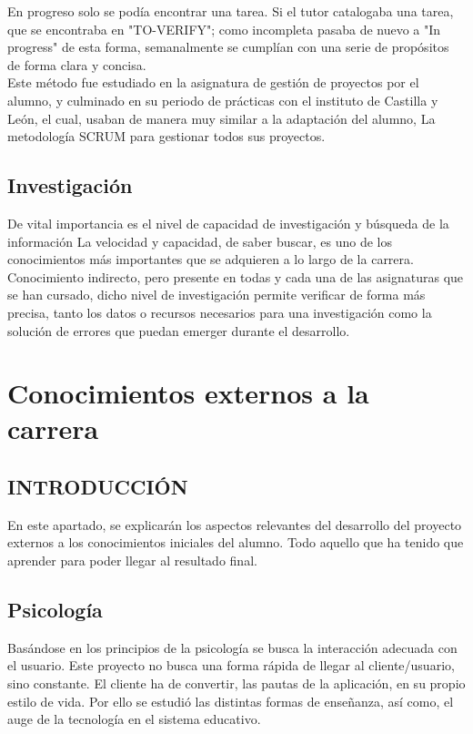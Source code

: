En progreso solo se podía encontrar una tarea. Si el tutor catalogaba una tarea, que se encontraba en "TO-VERIFY"; como incompleta pasaba de nuevo a "In progress" de esta forma, semanalmente se cumplían con una serie de propósitos de forma clara y concisa. \\
Este método fue estudiado en la asignatura de gestión de proyectos por el alumno, y culminado en su periodo de prácticas con el instituto de Castilla y León, el cual, usaban de manera muy similar a la adaptación del alumno, La metodología SCRUM para gestionar todos sus proyectos.\\

\subsection{Investigación}
De vital importancia es el nivel de capacidad de investigación y búsqueda de la información La velocidad y capacidad, de saber buscar, es uno de los conocimientos más importantes que se adquieren a lo largo de la carrera. Conocimiento indirecto, pero presente en todas y cada una de las asignaturas que se han cursado, dicho nivel de investigación permite verificar de forma más precisa, tanto los datos o recursos necesarios para una investigación como la solución de errores que puedan emerger durante el desarrollo.
\section{Conocimientos externos a la carrera}
\subsection{INTRODUCCIÓN}
En este apartado, se explicarán los aspectos relevantes del desarrollo del proyecto externos a los conocimientos iniciales del alumno. Todo aquello que ha tenido que aprender para poder llegar al resultado final.
\subsection{Psicología}
Basándose en los principios de la psicología se busca la interacción adecuada con el usuario. Este proyecto no busca una forma rápida de llegar al cliente/usuario, sino constante. El cliente ha de convertir, las pautas de la aplicación, en su propio estilo de vida. Por ello se estudió las distintas formas de enseñanza, así como, el auge de la tecnología en el sistema educativo.
